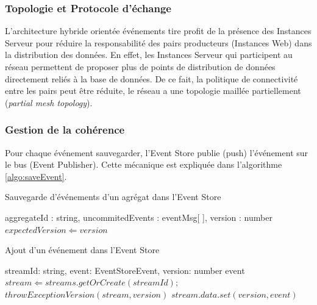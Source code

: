 \subsubsection{Topologie et Protocole d'échange}
L'architecture hybride orientée \og événements\fg{} tire profit de la présence des 
Instances Serveur pour réduire la responsabilité des pairs producteurs (Instances 
Web) dans la distribution des données. En effet, les Instances Serveur qui 
participent au réseau permettent de proposer plus de points de distribution de 
données directement reliés à la base de données. De ce fait, la politique de 
connectivité entre les pairs peut être réduite, le réseau a une topologie maillée 
partiellement (\textit{partial mesh topology}). 


\subsubsection{Gestion de la cohérence}



Pour chaque événement sauvegarder, l’Event Store publie (push) l’événement sur 
le bus (Event Publisher). Cette mécanique est expliquée dans l'algorithme 
\ref{algo:saveEvent}. 

\begin{algorithm} %
	\caption{Sauvegarde d'événements d'un agrégat dans l'Event Store} %
	\label{algo:saveEvent} %
	\begin{algorithmic} %
		\REQUIRE aggregateId : string, uncommitedEvents : eventMsg[ ], 
		version : number
		\STATE $expectedVersion \Leftarrow version$
		\ENDFOR
	\end{algorithmic}
\end{algorithm}
\begin{algorithm} %
	\caption{Ajout d'un événement dans l'Event Store} %
	\label{algo:addevent} %
	\begin{algorithmic} %
		\REQUIRE streamId: string, event: EventStoreEvent, version: number
		\ENSURE event
		\STATE $stream \Leftarrow streams.getOrCreate(streamId);$
		\STATE $throwExceptionVersion(stream,version)$
		\ENDIF
		\STATE $stream.data.set(version,event) $
	\end{algorithmic}
\end{algorithm}

